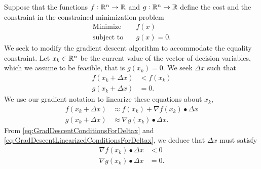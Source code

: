 Suppose that the functions $f:\mathbb R^n \to \mathbb R$ and $g:\mathbb R^n \to \mathbb R$ define the cost and the constraint in the constrained minimization problem 
\begin{equation}
\label{eq:GenericSingleConstraintOptimizationProblemContextGradientDescent}
\begin{aligned}
\text{Minimize} \quad & f(x)\\
\text{subject to} \quad & g(x) = 0.
\end{aligned}    
\end{equation}
We seek to modify the gradient descent algorithm to accommodate the equality constraint. Let $x_k \in \mathbb R^n$  be the current value of the vector of decision variables, which we assume to be feasible, that is $g(x_k) = 0$. We seek $\Delta x$ such that
\begin{equation}
\label{eq:GradDescentConditionsForDeltax}
\begin{aligned}    
    f(x_k + \Delta x) & < f(x_k) \\
    g(x_k + \Delta x) & =0.
\end{aligned}
\end{equation}
We use our gradient notation to linearize these equations about $x_k$,
\begin{equation}
\label{eq:GradDescentLinearizedConditionsForDeltax}
\begin{aligned}    
    f(x_k + \Delta x) & \approx f(x_k)  + \nabla f(x_k) \bullet \Delta x\\
    g(x_k + \Delta x) & \approx \nabla g(x_k) \bullet \Delta x.
\end{aligned}
\end{equation}
From \eqref{eq:GradDescentConditionsForDeltax} and \eqref{eq:GradDescentLinearizedConditionsForDeltax}, we deduce that $\Delta x$ must satisfy 
\begin{equation}
\begin{aligned}    
    \nabla f(x_k) \bullet \Delta x &< 0\\
    \nabla g(x_k) \bullet \Delta x &= 0.
\end{aligned}
\end{equation}

